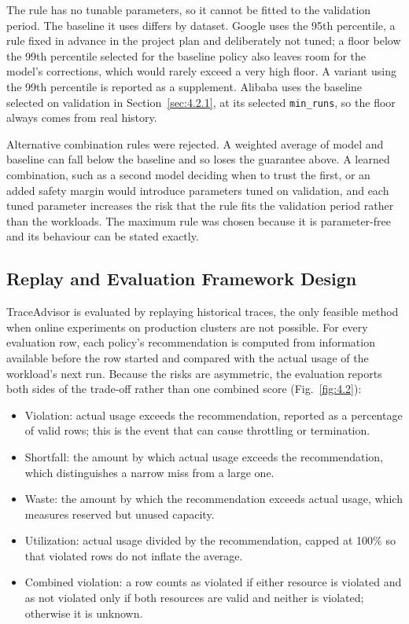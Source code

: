 \documentclass{IEEEtran}
\providecommand{\tightlist}{\setlength{\itemsep}{0pt}\setlength{\parskip}{0pt}}
\begin{document}
The rule has no tunable parameters, so it cannot be fitted to the validation period. The baseline it uses differs by dataset. Google uses the 95th percentile, a rule fixed in advance in the project plan and deliberately not tuned; a floor below the 99th percentile selected for the baseline policy also leaves room for the model's corrections, which would rarely exceed a very high floor. A variant using the 99th percentile is reported as a supplement. Alibaba uses the baseline selected on validation in Section~\ref{sec:4.2.1}, at its selected \texttt{min\_runs}, so the floor always comes from real history.

Alternative combination rules were rejected. A weighted average of model and baseline can fall below the baseline and so loses the guarantee above. A learned combination, such as a second model deciding when to trust the first, or an added safety margin would introduce parameters tuned on validation, and each tuned parameter increases the risk that the rule fits the validation period rather than the workloads. The maximum rule was chosen because it is parameter-free and its behaviour can be stated exactly.

\subsection{Replay and Evaluation Framework Design}\label{sec:4.3}

TraceAdvisor is evaluated by replaying historical traces, the only feasible method when online experiments on production clusters are not possible. For every evaluation row, each policy's recommendation is computed from information available before the row started and compared with the actual usage of the workload's next run. Because the risks are asymmetric, the evaluation reports both sides of the trade-off rather than one combined score (Fig.~\ref{fig:4.2}):

\begin{itemize}
\tightlist
\item
  Violation: actual usage exceeds the recommendation, reported as a percentage of valid rows; this is the event that can cause throttling or termination.
\item
  Shortfall: the amount by which actual usage exceeds the recommendation, which distinguishes a narrow miss from a large one.
\item
  Waste: the amount by which the recommendation exceeds actual usage, which measures reserved but unused capacity.
\item
  Utilization: actual usage divided by the recommendation, capped at 100\% so that violated rows do not inflate the average.
\item
  Combined violation: a row counts as violated if either resource is violated and as not violated only if both resources are valid and neither is violated; otherwise it is unknown.
\end{itemize}
\end{document}
